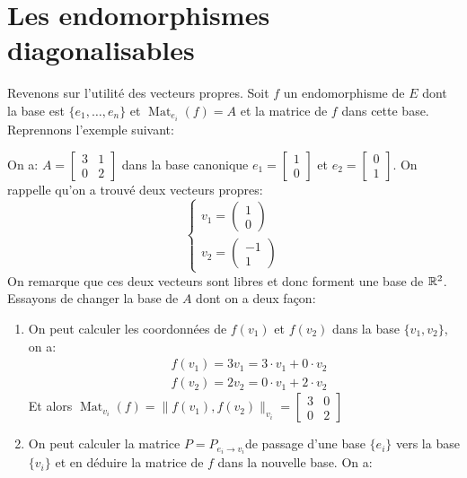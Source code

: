 \section{Les endomorphismes diagonalisables}
Revenons sur l'utilité des vecteurs propres. Soit $f$ un endomorphisme de  $E$ dont la base est  $\{e_1, \ldots, e_n\}$ et $\operatorname{Mat}_{e_i}(f) = A$ et la matrice de  $f$ dans cette base. Reprennons l'exemple suivant:
 \begin{eg}
     On a: $A = \begin{bmatrix} 3 & 1\\ 0 & 2 \end{bmatrix} $ dans la base canonique $e_1 = \begin{bmatrix} 1 \\ 0 \end{bmatrix} $ et $e_2 = \begin{bmatrix} 0 \\ 1 \end{bmatrix} $. On rappelle qu'on a trouvé deux vecteurs propres:
     \[
     \begin{cases}
         v_1 = \begin{pmatrix} 1 \\ 0 \end{pmatrix} \\
         v_2 = \begin{pmatrix} -1 \\ 1 \end{pmatrix} 
     \end{cases}
     \] 
     On remarque que ces deux vecteurs sont libres et donc forment une base  de $\mathbb{R}^2$. Essayons de changer la base de $A$ dont on a deux façon:
      \begin{enumerate}
          \item On peut calculer les coordonnées de $f(v_1)$ et $f(v_2)$ dans la base $\{v_1, v_2\}$, on a:
              \begin{align*}
                  &f(v_1) = 3v_1 = 3 \cdot v_1 + 0 \cdot v_2\\
                  &f(v_2) = 2v_2 = 0 \cdot v_1 + 2 \cdot v_2
              \end{align*}
              Et alors $\operatorname{Mat}_{v_i}(f) = \|f(v_1), f(v_2)\|_{v_i} = \begin{bmatrix} 3 & 0 \\ 0 & 2 \end{bmatrix} $ 
          \item On peut calculer la matrice $P = P_{e_i \to v_i}$de passage d'une base $\{e_i\}$ vers la base  $\{v_i\}$ et en déduire la matrice de $f$ dans la nouvelle base. On a:

\end{enumerate}
\end{eg}
